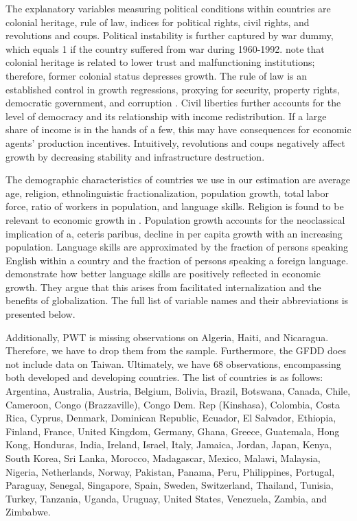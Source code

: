 \begin{subappendices}
The explanatory variables measuring political conditions within countries are colonial heritage, rule of law, indices for political rights, civil rights, and revolutions and coups. Political instability is further captured by war dummy, which equals 1 if the country suffered from war during 1960-1992. \citet{Acemogluetal2001} note that colonial heritage is related to lower trust and malfunctioning institutions; therefore, former colonial status depresses growth. The rule of law is an established control in growth regressions, proxying for security, property rights, democratic government, and corruption \citep{HaggardTiede2011}. Civil liberties further accounts for the level of democracy and its relationship with income redistribution. If a large share of income is in the hands of a few, this may have consequences for economic agents' production incentives. Intuitively, revolutions and coups negatively affect growth by decreasing stability and infrastructure destruction.

The demographic characteristics of countries we use in our estimation are average age, religion, ethnolinguistic fractionalization, population growth, total labor force, ratio of workers in population, and language skills. Religion is found to be relevant to economic growth in \citet{Barro1996}. Population growth accounts for the neoclassical implication of a, ceteris paribus, decline in per capita growth with an increasing population. Language skills are approximated by the fraction of persons speaking English within a country and the fraction of persons speaking a foreign language. \citet{HallJones1996} demonstrate how better language skills are positively reflected in economic growth. They argue that this arises from facilitated internalization and the benefits of globalization. The full list of variable names and their abbreviations is presented below.

Additionally, \ac{PWT} is missing observations on Algeria, Haiti, and Nicaragua. Therefore, we have to drop them from the sample. Furthermore, the GFDD does not include data on Taiwan. Ultimately, we have 68 observations, encompassing both developed and developing countries. The list of countries is as follows: Argentina, Australia, Austria, Belgium, Bolivia, Brazil, Botswana, Canada, Chile, Cameroon, Congo (Brazzaville), Congo Dem. Rep (Kinshasa), Colombia, Costa Rica, Cyprus, Denmark, Dominican Republic, Ecuador, El Salvador, Ethiopia, Finland, France, United Kingdom, Germany, Ghana, Greece, Guatemala, Hong Kong, Honduras, India, Ireland, Israel, Italy, Jamaica, Jordan, Japan, Kenya, South Korea, Sri Lanka, Morocco, Madagascar, Mexico, Malawi, Malaysia, Nigeria, Netherlands, Norway, Pakistan, Panama, Peru, Philippines, Portugal, Paraguay, Senegal, Singapore, Spain, Sweden, Switzerland, Thailand, Tunisia, Turkey, Tanzania, Uganda, Uruguay, United States, Venezuela, Zambia, and Zimbabwe.


\end{subappendices}
